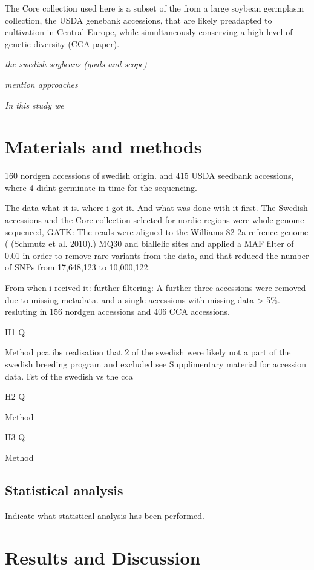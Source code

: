 \documentclass[9pt,twocolumn,twoside,lineno]{gsajnl}
\begin{document}
The Core collection used here is a subset of the from a large soybean germplasm collection, the  USDA genebank accessions, that are likely preadapted to cultivation in Central Europe, while simultaneously conserving a high level of genetic diversity (CCA paper). 

\textit{the swedish soybeans (goals and scope)}


\textit{mention approaches}

\textit{In this study we}

\section{Materials and methods}
\label{sec:materials:methods}

160 nordgen accessions of swedish origin. and 415 USDA seedbank accessions, where 4 didnt germinate in time for the sequencing.  

The data what it is. where i got it.   And what was done with it first. 
The  Swedish accessions and the Core collection selected for nordic regions were whole genome sequenced, 
GATK: 
The reads were aligned to the Williams 82 2a refrence genome ( (Schmutz et al. 2010).)
MQ30 and biallelic sites and applied a MAF filter of 0.01 in order to remove rare variants from the data, and that reduced the number of SNPs from 17,648,123 to 10,000,122.

From when i recived it:
further filtering:
A further three accessions were removed due to missing metadata. and a single accessions with missing data > 5\%.
resluting in 156 nordgen accessions and 406 CCA accessions. 

H1
Q

Method
pca
ibs
realisation that 2 of the swedish were likely not a part of the swedish breeding program and excluded 
see Supplimentary material for accession data. 
Fst of the swedish vs the cca

H2 
Q

Method

H3
Q 

Method


\subsection{Statistical analysis}

Indicate what statistical analysis has been performed.


\section{Results and Discussion}
\end{document}
